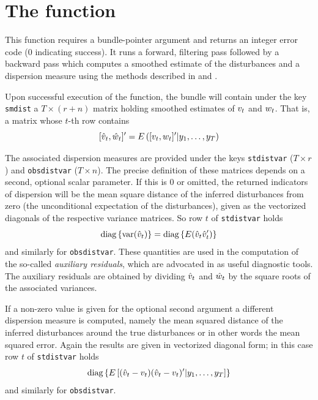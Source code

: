 \documentclass[a4paper]{article}
\begin{document}
\section{The  function}
\label{sec:kdsmooth}

This function requires a bundle-pointer argument and returns an
integer error code (0 indicating success).  It runs a forward,
filtering pass followed by a backward pass which computes a smoothed
estimate of the disturbances and a dispersion measure using the
methods described in \cite{koopman93} and \cite{koopman-etal99}.

Upon successful execution of the function, the bundle will contain
under the key \texttt{smdist} a $T \times (r+n)$ matrix holding
smoothed estimates of $v_t$ and $w_t$. That is, a matrix
whose $t$-th row contains
\[
[\hat{v}_t , \hat{w}_t]' 
 = E\left( [v_t , w_t]' | y_1, \ldots, y_T \right)
\]

The associated dispersion measures are provided under the keys
\texttt{stdistvar} ($T \times r$) and \texttt{obsdistvar}
($T \times n$).  The precise definition of these matrices depends on a
second, optional scalar parameter. If this is 0 or omitted, the
returned indicators of dispersion will be the mean square distance of
the inferred disturbances from zero (the unconditional expectation of
the disturbances), given as the vectorized diagonals of the
respective variance matrices. So row $t$ of \texttt{stdistvar} holds
\[
\mbox{diag}\left\{\mbox{var}(\hat{v}_t)\right\} = 
\mbox{diag}\left\{E(\hat{v}_t\hat{v}_t')\right\}
\]
and similarly for \texttt{obsdistvar}.  These quantities are used in
the computation of the so-called \emph{auxiliary residuals}, which are
advocated in \cite{durbin-koopman12} as useful diagnostic tools. The
auxiliary residuals are obtained by dividing $\hat{v}_t$ and
$\hat{w}_t$ by the square roots of the associated variances.

If a non-zero value is given for the optional second argument a
different dispersion measure is computed, namely the mean squared
distance of the inferred disturbances around the true disturbances or
in other words the mean squared error. Again the results are given in
vectorized diagonal form; in this case row $t$ of \texttt{stdistvar}
holds
\[
\mbox{diag}\left\{E\left[
 (\hat{v}_t-v_t)(\hat{v}_t-v_t)'
 | y_1, \ldots, y_T \right]\right\}
\]
and similarly for \texttt{obsdistvar}.
\end{document}
